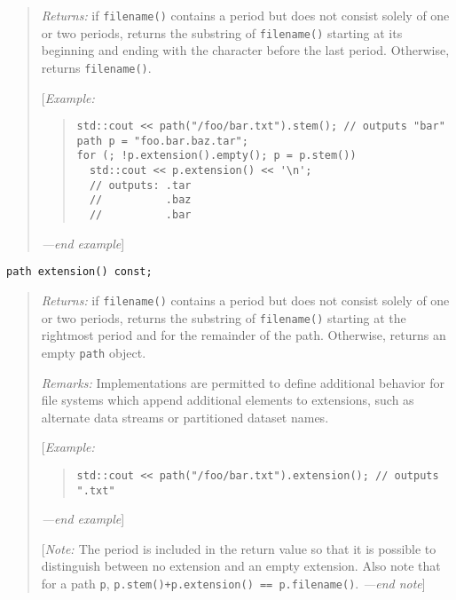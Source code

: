 \begin{quote}
\emph{Returns:} if \texttt{filename()} contains a period but does not
consist solely of one or two periods, returns the substring of
\texttt{filename()} starting at its beginning and ending with the
character before the last period. Otherwise, returns
\texttt{filename()}.

{[}\emph{Example:}

\begin{quote}
\begin{verbatim}
std::cout << path("/foo/bar.txt").stem(); // outputs "bar"
path p = "foo.bar.baz.tar";
for (; !p.extension().empty(); p = p.stem())
  std::cout << p.extension() << '\n';
  // outputs: .tar
  //          .baz
  //          .bar
\end{verbatim}
\end{quote}

\emph{---end example}{]}
\end{quote}

\begin{verbatim}
path extension() const;
\end{verbatim}

\begin{quote}
\emph{Returns:} if \texttt{filename()} contains a period but does not
consist solely of one or two periods, returns the substring of
\texttt{filename()} starting at the rightmost period and for the
remainder of the path. Otherwise, returns an empty \texttt{path} object.

\emph{Remarks:} Implementations are permitted to define additional
behavior for file systems which append additional elements to
extensions, such as alternate data streams or partitioned dataset names.

{[}\emph{Example:}

\begin{quote}
\begin{verbatim}
std::cout << path("/foo/bar.txt").extension(); // outputs ".txt"
\end{verbatim}
\end{quote}

\emph{---end example}{]}

{[}\emph{Note: \textbf{}} The period is included in the return value so
that it is possible to distinguish between no extension and an empty
extension. Also note that for a path \texttt{p},
\texttt{p.stem()+p.extension()\ ==\ p.filename()}. \emph{---end note}{]}
\end{quote}

